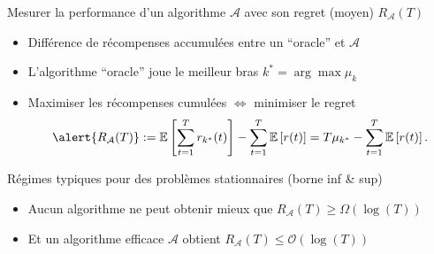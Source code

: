 \documentclass[11pt,english,ignorenonframetext,]{beamer}
\begin{document}
\begin{frame}{Mesurer la performance d'un algorithme $\mathcal{A}$ avec son regret (moyen) $R_{\mathcal{A}}(T)$}

\pause

\begin{itemize}
  \item
  Différence de récompenses accumulées entre un ``oracle'' et $\mathcal{A}$

  \item
  L'algorithme ``oracle'' joue le meilleur bras $k^* = \arg\max \mu_k$


  \item
  Maximiser les récompenses cumulées
  $\Longleftrightarrow$ \alert{minimiser le regret}
  \[ \alert{ R_{\mathcal{A}}(T) } := \mathbb{E}\left[ \sum\limits_{t=1}^T r_{k^*}(t) \right] - \sum\limits_{t=1}^T \mathbb{E}\left[ r(t) \right] = T \mu_{k^*} - \sum\limits_{t=1}^T \mathbb{E}\left[ r(t) \right]. \]

\end{itemize}

\pause
\vspace*{10pt}

\begin{exampleblock}{Régimes typiques pour des problèmes stationnaires (borne inf \& sup)}
  \begin{itemize}
  \item
  Aucun algorithme ne peut obtenir mieux que
  \hfill{}
  $R_{\mathcal{A}}(T) \geq \Omega(\log(T))$

  \item
  Et un algorithme efficace $\mathcal{A}$ obtient
  \hfill{}
  $R_{\mathcal{A}}(T) \leq \mathcal{O}(\log(T))$
  \end{itemize}
\end{exampleblock}



\end{frame}
\end{document}
